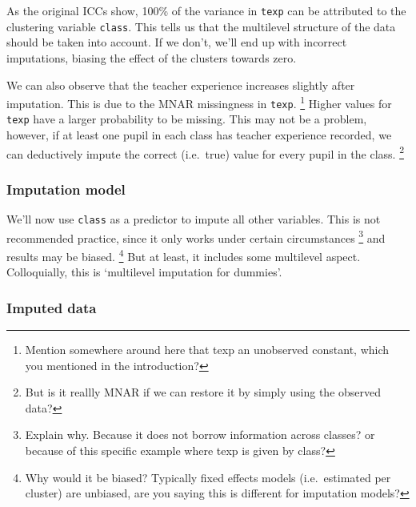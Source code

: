 \documentclass[
]{jss}
\begin{document}
As the original ICCs show, 100\% of the variance in \texttt{texp} can be
attributed to the clustering variable \texttt{class}. This tells us that
the multilevel structure of the data should be taken into account. If we
don't, we'll end up with incorrect imputations, biasing the effect of
the clusters towards zero.

We can also observe that the teacher experience increases slightly after
imputation. This is due to the MNAR missingness in \texttt{texp}.
\footnote{Mention somewhere around here that texp an unobserved
  constant, which you mentioned in the introduction?} Higher values for
\texttt{texp} have a larger probability to be missing. This may not be a
problem, however, if at least one pupil in each class has teacher
experience recorded, we can deductively impute the correct (i.e.~true)
value for every pupil in the class. \footnote{But is it reallly MNAR if
  we can restore it by simply using the observed data?}

\hypertarget{imputation-model-1}{%
\subsubsection{Imputation model}\label{imputation-model-1}}

We'll now use \texttt{class} as a predictor to impute all other
variables. This is not recommended practice, since it only works under
certain circumstances \footnote{Explain why. Because it does not borrow
  information across classes? or because of this specific example where
  texp is given by class?} and results may be biased. \footnote{Why
  would it be biased? Typically fixed effects models (i.e.~estimated per
  cluster) are unbiased, are you saying this is different for imputation
  models?} But at least, it includes some multilevel aspect.
Colloquially, this is `multilevel imputation for dummies'.

\hypertarget{imputed-data-1}{%
\subsubsection{Imputed data}\label{imputed-data-1}}
\end{document}
